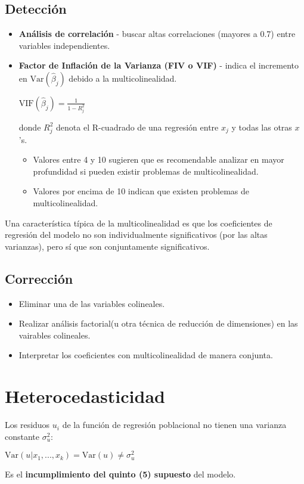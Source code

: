 \documentclass[10pt, a4paper, landscape]{extarticle}
\newcommand{\Var}{\mathrm{Var}}
\begin{document}
\begin{multicols}{3}
	\subsection*{Detección}
		\begin{itemize}[leftmargin=*]
			\item \textbf{Análisis de correlación} - buscar altas correlaciones (mayores a 0.7) entre variables independientes.
			\item \textbf{Factor de Inflación de la Varianza (FIV o VIF)} - indica el incremento en $\Var(\hat{\beta}_j)$ debido a la multicolinealidad.
			\begin{center}
				$\mathrm{VIF} (\hat{\beta}_j) = \frac{1}{1-R_j^2}$
			\end{center}
			donde $R^2_j$ denota el R-cuadrado de una regresión entre $x_j$ y todas las otras $x$'s. 
			\begin{itemize}[leftmargin=*]
				\item Valores entre 4 y 10 sugieren que es recomendable analizar en mayor profundidad si pueden existir problemas de multicolinealidad.
				\item Valores por encima de 10 indican que existen problemas de multicolinealidad.
			\end{itemize}
		\end{itemize}
		Una característica típica de la multicolinealidad es que los coeficientes de regresión del modelo no son individualmente significativos (por las altas varianzas), pero sí que son conjuntamente significativos.
	\subsection*{Corrección}
		\begin{itemize}[leftmargin=*]
			\item Eliminar una de las variables colineales.
			\item Realizar análisis factorial(u otra técnica de reducción de dimensiones) en las vairables colineales.
			\item Interpretar los coeficientes con multicolinealidad de manera conjunta.
		\end{itemize}
\columnbreak
\section*{Heterocedasticidad}
	Los residuos $u_i$ de la función de regresión poblacional no tienen una varianza constante $\sigma^2_u$:
	\begin{center}
		$\Var(u |x_1, ..., x_k) = \Var(u) \neq \sigma^2_u$
	\end{center}
	Es el \textbf{incumplimiento del quinto (5) supuesto} del modelo.

\end{multicols}
\end{document}
